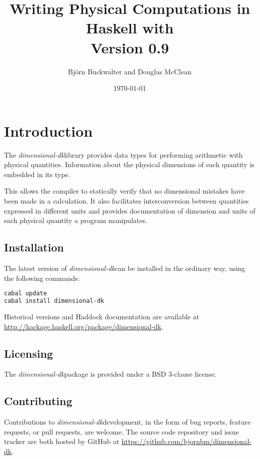 \documentclass[12pt]{report}
\title{
	{Writing Physical Computations in Haskell with \thispackage}\\
	{\small{Version 0.9}}
}
\author{Björn Buckwalter and Douglas McClean}
\date{\today}
\newcommand{\packagename}[1]{\textit{#1}}
\newcommand{\thispackage}{\packagename{dimensional-dk}}
\begin{document}
\maketitle

\tableofcontents

\chapter{Introduction}

The \thispackage library provides data types for performing arithmetic with physical
quantities. Information about the physical dimensions of each quantity is embedded in
its type.

This allows the compiler to statically verify that no dimensional mistakes have been
made in a calculation. It also facilitates interconversion between quantities expressed
in different units and provides documentation of dimension and units of each physical
quantity a program manipulates.

\section{Installation}

The latest version of \thispackage can be installed in the ordinary way, using the following commands:

\begin{lstlisting}[language=bash]
cabal update
cabal install dimensional-dk
\end{lstlisting}

Historical versions and Haddock documentation are available at \url{http://hackage.haskell.org/package/dimensional-dk}.

\section{Licensing}

The \thispackage package is provided under a BSD 3-clause license.

\section{Contributing}

Contributions to \thispackage development, in the form of bug reports,
feature requests, or pull requests, are welcome. The source code repository and issue
tracker are both hosted by GitHub at \url{https://github.com/bjornbm/dimensional-dk}.
\end{document}
